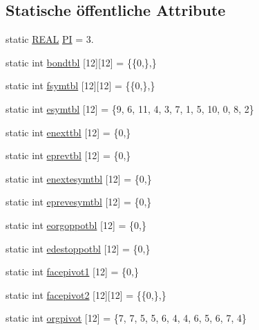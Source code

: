\subsection*{Statische öffentliche Attribute}
\begin{DoxyCompactItemize}
\item 
static \hyperlink{tetgen_8h_a4b654506f18b8bfd61ad2a29a7e38c25}{R\-E\-A\-L} \hyperlink{classtetgenmesh_ad6766e0d2dbbf0a642793fbd6ef98ae2}{P\-I} = 3.
\item 
static int \hyperlink{classtetgenmesh_a46550a87561b0b4a7dfc7a312b03d3ea}{bondtbl} \mbox{[}12\mbox{]}\mbox{[}12\mbox{]} = \{\{0,\},\}
\item 
static int \hyperlink{classtetgenmesh_ae98d2426c6fc6665cb96dcfa9a5df790}{fsymtbl} \mbox{[}12\mbox{]}\mbox{[}12\mbox{]} = \{\{0,\},\}
\item 
static int \hyperlink{classtetgenmesh_ae23c95f112c7dcc119b8780b36d6c833}{esymtbl} \mbox{[}12\mbox{]} = \{9, 6, 11, 4, 3, 7, 1, 5, 10, 0, 8, 2\}
\item 
static int \hyperlink{classtetgenmesh_afc8cb9e38dc9efd6c4903b00679d693e}{enexttbl} \mbox{[}12\mbox{]} = \{0,\}
\item 
static int \hyperlink{classtetgenmesh_aaa63200d533d2d774680a0cb72475361}{eprevtbl} \mbox{[}12\mbox{]} = \{0,\}
\item 
static int \hyperlink{classtetgenmesh_a786d6315851349b63d53f1eb8a1fcef1}{enextesymtbl} \mbox{[}12\mbox{]} = \{0,\}
\item 
static int \hyperlink{classtetgenmesh_aed59b6aa2586787f5bd0820d1ce41b4f}{eprevesymtbl} \mbox{[}12\mbox{]} = \{0,\}
\item 
static int \hyperlink{classtetgenmesh_a7c43767f721d455559988e2f168ff4b2}{eorgoppotbl} \mbox{[}12\mbox{]} = \{0,\}
\item 
static int \hyperlink{classtetgenmesh_a958c01959dff786bf047d2f270849ffa}{edestoppotbl} \mbox{[}12\mbox{]} = \{0,\}
\item 
static int \hyperlink{classtetgenmesh_af459523fb697a18a4cfd384a15eea491}{facepivot1} \mbox{[}12\mbox{]} = \{0,\}
\item 
static int \hyperlink{classtetgenmesh_abbb55c1b21510a209fd860e8c18a79d1}{facepivot2} \mbox{[}12\mbox{]}\mbox{[}12\mbox{]} = \{\{0,\},\}
\item 
static int \hyperlink{classtetgenmesh_a65e14fb4bf9fa6a240a9441ab73bdec5}{orgpivot} \mbox{[}12\mbox{]} = \{7, 7, 5, 5, 6, 4, 4, 6, 5, 6, 7, 4\}
\item 

\end{DoxyCompactItemize}
